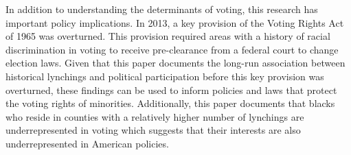 \documentclass[AEJ, finalmode]{AEA}
\begin{document}
In addition to understanding the determinants of voting, this research has important policy implications. In 2013, a key provision of the Voting Rights Act of 1965 was overturned. This provision required areas with a history of racial discrimination in voting to receive pre-clearance from a federal court to change election laws. Given that this paper documents the long-run association between historical lynchings and political participation before this key provision was overturned, these findings can be used to inform policies and laws that protect the voting rights of minorities. Additionally, this paper documents that blacks who reside in counties with a relatively higher number of lynchings are underrepresented in voting which suggests that their interests are also underrepresented in American policies.


\clearpage
\end{document}
